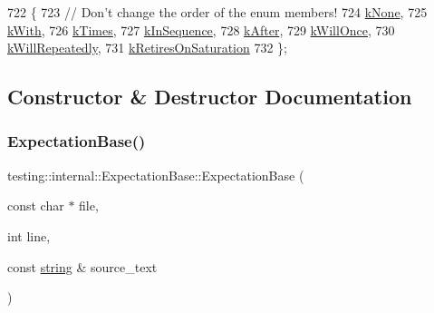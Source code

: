 \begin{DoxyCode}
722               \{
723     \textcolor{comment}{// Don't change the order of the enum members!}
724     \hyperlink{classtesting_1_1internal_1_1ExpectationBase_a450f34b979ec5814c91d4eab6b78cfc2ae25b940c0878d057628e3509830d84e9}{kNone},
725     \hyperlink{classtesting_1_1internal_1_1ExpectationBase_a450f34b979ec5814c91d4eab6b78cfc2a2a83fca10989c55ad16aafd2851ca139}{kWith},
726     \hyperlink{classtesting_1_1internal_1_1ExpectationBase_a450f34b979ec5814c91d4eab6b78cfc2a8080d1291dd355e3ad9478f8c8b79689}{kTimes},
727     \hyperlink{classtesting_1_1internal_1_1ExpectationBase_a450f34b979ec5814c91d4eab6b78cfc2ac9e8abdc7de4697d2174c560e7a0a595}{kInSequence},
728     \hyperlink{classtesting_1_1internal_1_1ExpectationBase_a450f34b979ec5814c91d4eab6b78cfc2a7988a8564321947266de0e74148ae4ec}{kAfter},
729     \hyperlink{classtesting_1_1internal_1_1ExpectationBase_a450f34b979ec5814c91d4eab6b78cfc2a571cc6a896cd99aa3532f6ab51a51b7a}{kWillOnce},
730     \hyperlink{classtesting_1_1internal_1_1ExpectationBase_a450f34b979ec5814c91d4eab6b78cfc2a4b568d2f88f5141c4c61bc53757791d1}{kWillRepeatedly},
731     \hyperlink{classtesting_1_1internal_1_1ExpectationBase_a450f34b979ec5814c91d4eab6b78cfc2a816336e701d7be1ca9e07998d41ba5af}{kRetiresOnSaturation}
732   \};
\end{DoxyCode}


\subsection{Constructor \& Destructor Documentation}
\mbox{\label{classtesting_1_1internal_1_1ExpectationBase_a8c82a7ecad5831a3ce5ce8cc56ae172d}} 
\subsubsection{\texorpdfstring{Expectation\+Base()}{ExpectationBase()}}
{\footnotesize\ttfamily testing\+::internal\+::\+Expectation\+Base\+::\+Expectation\+Base (\begin{DoxyParamCaption}\item[{const char $\ast$}]{file,  }\item[{int}]{line,  }\item[{const \hyperlink{namespacetesting_1_1internal_a8e8ff5b11e64078831112677156cb111}{string} \&}]{source\+\_\+text }\end{DoxyParamCaption})}



